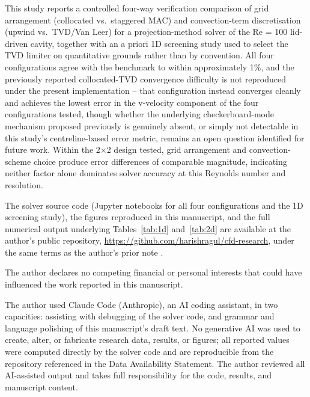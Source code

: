 \documentclass[CHICAGO]{USG}
\begin{document}
This study reports a controlled four-way verification comparison of grid arrangement (collocated vs.\ staggered MAC) and convection-term discretisation (upwind vs.\ TVD/Van Leer) for a projection-method solver of the Re = 100 lid-driven cavity, together with an a priori 1D screening study used to select the TVD limiter on quantitative grounds rather than by convention. All four configurations agree with the \citet{ghia1982} benchmark to within approximately 1\%, and the previously reported collocated-TVD convergence difficulty \citep{rajaramaduraikarthik2026} is not reproduced under the present implementation -- that configuration instead converges cleanly and achieves the lowest error in the v-velocity component of the four configurations tested, though whether the underlying checkerboard-mode mechanism proposed previously is genuinely absent, or simply not detectable in this study's centreline-based error metric, remains an open question identified for future work. Within the 2$\times$2 design tested, grid arrangement and convection-scheme choice produce error differences of comparable magnitude, indicating neither factor alone dominates solver accuracy at this Reynolds number and resolution.


The solver source code (Jupyter notebooks for all four configurations and the 1D screening study), the figures reproduced in this manuscript, and the full numerical output underlying Tables~\ref{tab:1d} and~\ref{tab:2d} are available at the author's public repository, \url{https://github.com/harishragul/cfd-research}, under the same terms as the author's prior note \citep{rajaramaduraikarthik2026}.


The author declares no competing financial or personal interests that could have influenced the work reported in this manuscript.


The author used Claude Code (Anthropic), an AI coding assistant, in two capacities: assisting with debugging of the solver code, and grammar and language polishing of this manuscript's draft text. No generative AI was used to create, alter, or fabricate research data, results, or figures; all reported values were computed directly by the solver code and are reproducible from the repository referenced in the Data Availability Statement. The author reviewed all AI-assisted output and takes full responsibility for the code, results, and manuscript content.
\end{document}
